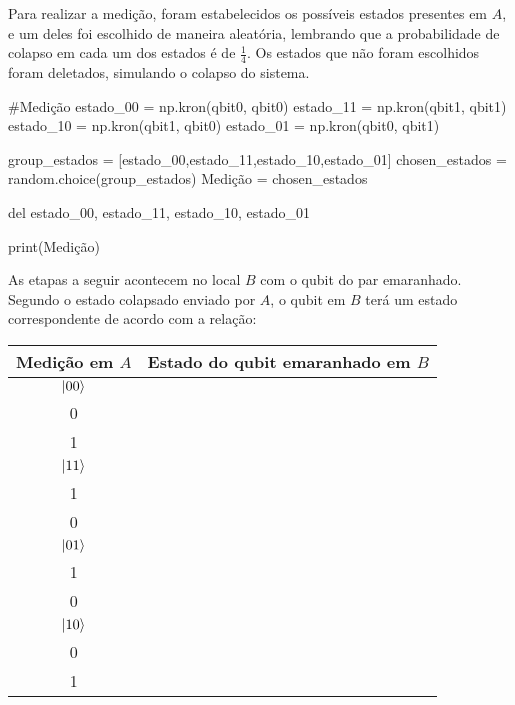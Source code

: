 Para realizar a medição, foram estabelecidos os possíveis estados presentes em \(A\), e um deles foi escolhido de maneira aleatória, lembrando que a probabilidade de colapso em cada um dos estados é de \(\frac{1}{4}\). Os estados que não foram escolhidos foram deletados, simulando o colapso do sistema.
\begin{pycode}
    #Medição
	estado_00 = np.kron(qbit0, qbit0)
	estado_11 = np.kron(qbit1, qbit1)
	estado_10 = np.kron(qbit1, qbit0)
	estado_01 = np.kron(qbit0, qbit1)

	group_estados = [estado_00,estado_11,estado_10,estado_01]
	chosen_estados = random.choice(group_estados)
	Medição = chosen_estados

	del estado_00, estado_11, estado_10, estado_01

	print(Medição)
\end{pycode}
As etapas a seguir acontecem no local \(B\) com o qubit do par emaranhado. Segundo o estado colapsado enviado por \(A\), o qubit em \(B\) terá um estado correspondente de acordo com a relação:
\begin{center}
  \begin{tabular}{cc}
    \toprule
    Medição em \(A\) & Estado do qubit emaranhado em \(B\) \\
    \midrule
    \(\ket{00}\) & \(\alpha \begin{bmatrix} 1 \\ 0 \end{bmatrix} + \beta \begin{bmatrix} 0 \\ 1 \end{bmatrix}\) \\
    \(\ket{11}\) & \(\alpha \begin{bmatrix} 0 \\ 1 \end{bmatrix} - \beta \begin{bmatrix} 1 \\ 0 \end{bmatrix}\) \\
    \(\ket{01}\) & \(\alpha \begin{bmatrix} 0 \\ 1 \end{bmatrix} + \beta \begin{bmatrix} 1 \\ 0 \end{bmatrix}\) \\
    \(\ket{10}\) & \(\alpha \begin{bmatrix} 1 \\ 0 \end{bmatrix} - \beta \begin{bmatrix} 0 \\ 1 \end{bmatrix}\) \\
    \bottomrule
  \end{tabular}
\end{center}
